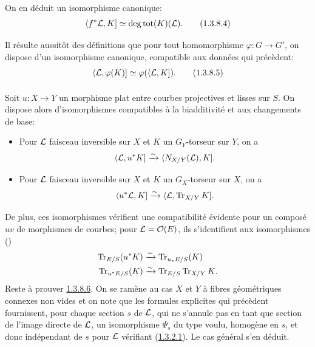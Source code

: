 \documentclass[10pt]{../fichiers-configuration-latex/smfart}
\begin{document}
On en déduit un isomorphisme canonique:
\begin{equation*}
\langle f^{\ast}{\mathcal L},K]\simeq \deg\operatorname{tot}(K)({\mathcal L}){}.\tag{1.3.8.4}
\end{equation*}

Il résulte aussitôt des définitions que pour tout homomorphisme
$\varphi:G\rightarrow G'$, on dispose d'un isomorphisme canonique,
compatible aux données qui précèdent:
\begin{equation*}
\langle {\mathcal L},\varphi(K)]\simeq \varphi(\langle {\mathcal L},K]){}.\tag{1.3.8.5}
\end{equation*}

\setcounter{paragraph}{5}
\paragraph{}
Soit $u:X\rightarrow Y$ un morphisme plat entre courbes projectives et
lisses sur $S$. On dispose alors d'isomorphismes compatibles à la
biadditivité et aux changements de base:
\begin{itemize}
\item[--] Pour ${\mathcal L}$ faisceau inversible sur $X$ et $K$ un
$G_{Y}$-torseur sur $Y$, on a
$$
\langle {\mathcal L}, u^{\ast}K]\xrightarrow{\sim}\langle N_{X/Y}({\mathcal L}),K]{}.
$$

\item[--] Pour ${\mathcal L}$ faisceau inversible sur $X$ et $K$ un
$G_{X}$-torseur sur $X$, on a
$$
\langle u^{\ast}{\mathcal L},K]\xrightarrow{\sim}
\langle {\mathcal L},\operatorname{Tr}_{X/Y}K]{}.
$$
\end{itemize}
De plus, ces isomorphismes vérifient une compatibilité évidente pour
un composé $uv$ de morphismes de courbes; pour ${\mathcal L}={\mathcal O}(E)$,
ils s'identifient aux isomorphismes ()
\begin{align*}
\operatorname{Tr}_{E/S}(u^{\ast}K) &\xrightarrow{\sim} \operatorname{Tr}_{u_{\ast}E/S}(K)\\
\operatorname{Tr}_{u^{\ast}E/S}(K) &\xrightarrow{\sim} \operatorname{Tr}_{E/S}\operatorname{Tr}_{X/Y}K{}.
\end{align*}
Reste à prouver \hyperref[XVIII.par1.3.8.6]{1.3.8.6}. On se ramène au cas $X$ et $Y$ à fibres
géométriques connexes non vides et on note que les formules explicites
qui précèdent fournissent, pour chaque section $s$ de ${\mathcal L}$,
qui ne s'annule pas en tant que section de l'image directe de
${\mathcal L}$, un isomorphisme $\Psi_{s}$ du type voulu, homogène en
$s$, et donc indépendant de $s$ pour ${\mathcal L}$ vérifiant
(\hyperref[XVIII.par1.3.2.1]{1.3.2.1}). Le cas général s'en déduit.
\end{document}
